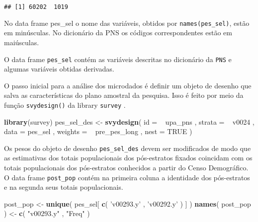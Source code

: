 \documentclass[]{book}
\newenvironment{Shaded}{\begin{snugshade}}{\end{snugshade}}
\newcommand{\KeywordTok}[1]{\textcolor[rgb]{0.13,0.29,0.53}{\textbf{{#1}}}}
\newcommand{\DataTypeTok}[1]{\textcolor[rgb]{0.13,0.29,0.53}{{#1}}}
\newcommand{\StringTok}[1]{\textcolor[rgb]{0.31,0.60,0.02}{{#1}}}
\newcommand{\OtherTok}[1]{\textcolor[rgb]{0.56,0.35,0.01}{{#1}}}
\newcommand{\NormalTok}[1]{{#1}}
\theoremstyle{definition}
\theoremstyle{definition}
\theoremstyle{remark}
\let\BeginKnitrBlock\begin \let\EndKnitrBlock\end
\begin{document}
\begin{verbatim}
## [1] 60202  1019
\end{verbatim}

\BeginKnitrBlock{remark}
\iffalse {Observação } \fi{} No data frame pes\_sel o nome das
variáveis, obtidos por \texttt{names(pes\_sel)}, estão em minúsculas. No
dicionário da PNS os códigos correspondentes estão em maiúsculas.
\EndKnitrBlock{remark} O data frame \texttt{pes\_sel} contém as
variáveis descritas no dicionário da \texttt{PNS} e algumas variáveis
obtidas derivadas.

O passo inicial para a análise dos microdados é definir um objeto de
desenho que salva as características do plano amostral da pesquisa. Isso
é feito por meio da função \texttt{svydesign()} da library
\texttt{survey} \citep{R-survey}.

\begin{Shaded}
\begin{Highlighting}[]
\KeywordTok{library}\NormalTok{(survey)}
\NormalTok{pes_sel_des <-}
\StringTok{    }\KeywordTok{svydesign}\NormalTok{(}
        \DataTypeTok{id =} \NormalTok{~}\StringTok{ }\NormalTok{upa_pns ,}
        \DataTypeTok{strata =} \NormalTok{~}\StringTok{ }\NormalTok{v0024 ,}
        \DataTypeTok{data =} \NormalTok{pes_sel ,}
        \DataTypeTok{weights =} \NormalTok{~}\StringTok{ }\NormalTok{pre_pes_long ,}
        \DataTypeTok{nest =} \OtherTok{TRUE}
    \NormalTok{)}
\end{Highlighting}
\end{Shaded}

Os pesos do objeto de desenho \texttt{pes\_sel\_des} devem ser
modificados de modo que as estimativas dos totais populacionais dos
pós-estratos fixados coincidam com os totais populacionais dos
pós-estratos conhecidos a partir do Censo Demográfico. O data frame
\texttt{post\_pop} contém na primeira coluna a identidade dos
pós-estratos e na segunda seus totais populacionais.

\begin{Shaded}
\begin{Highlighting}[]
\NormalTok{post_pop <-}\StringTok{ }\KeywordTok{unique}\NormalTok{( pes_sel[ }\KeywordTok{c}\NormalTok{( }\StringTok{'v00293.y'} \NormalTok{, }\StringTok{'v00292.y'} \NormalTok{) ] )}
\KeywordTok{names}\NormalTok{( post_pop ) <-}\StringTok{ }\KeywordTok{c}\NormalTok{( }\StringTok{"v00293.y"} \NormalTok{, }\StringTok{"Freq"} \NormalTok{)}
\end{Highlighting}
\end{Shaded}
\end{document}

